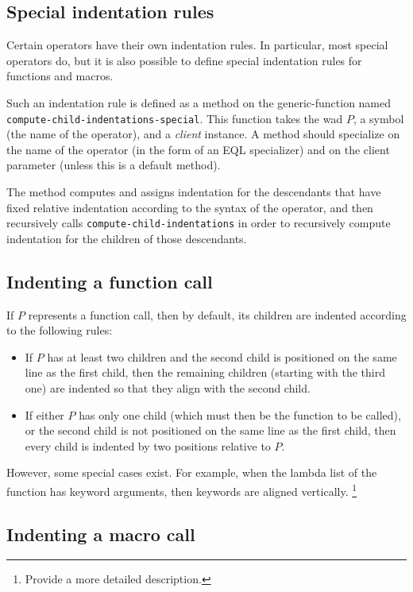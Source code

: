 \subsection{Special indentation rules}

Certain operators have their own indentation rules.  In particular,
most special operators do, but it is also possible to define special
indentation rules for functions and macros.

Such an indentation rule is defined as a method on the
generic-function named \texttt{compute-child-indentations-special}.
This function takes the wad $P$, a symbol (the name of the
operator), and a \emph{client} instance.  A method should specialize
on the name of the operator (in the form of an EQL specializer) and on
the client parameter (unless this is a default method).

The method computes and assigns indentation for the descendants that
have fixed relative indentation according to the syntax of the
operator, and then recursively calls
\texttt{compute-child-indentations} in order to recursively compute
indentation for the children of those descendants.

\subsection{Indenting a function call}

If $P$ represents a function call, then by default, its children are
indented according to the following rules:

\begin{itemize}
\item If $P$ has at least two children and the second child is
  positioned on the same line as the first child, then the remaining
  children (starting with the third one) are indented so that they
  align with the second child.
\item If either $P$ has only one child (which must then be the
  function to be called), or the second child is not positioned on the
  same line as the first child, then every child is indented by two
  positions relative to $P$.
\end{itemize}

However, some special cases exist.  For example, when the lambda list
of the function has keyword arguments, then keywords are aligned
vertically.%
\footnote{Provide a more detailed description.}

\subsection{Indenting a macro call}

